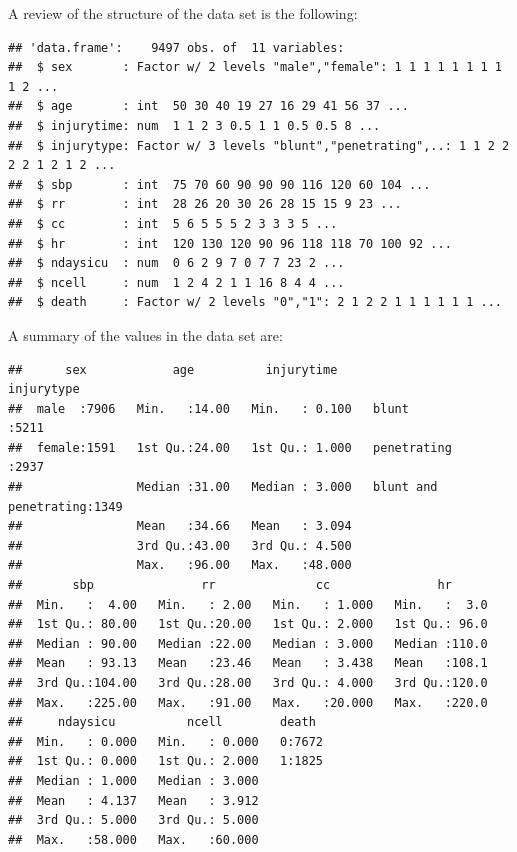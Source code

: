 \documentclass[
]{article}
\begin{document}
A review of the structure of the data set is the following:

\begin{verbatim}
## 'data.frame':    9497 obs. of  11 variables:
##  $ sex       : Factor w/ 2 levels "male","female": 1 1 1 1 1 1 1 1 1 2 ...
##  $ age       : int  50 30 40 19 27 16 29 41 56 37 ...
##  $ injurytime: num  1 1 2 3 0.5 1 1 0.5 0.5 8 ...
##  $ injurytype: Factor w/ 3 levels "blunt","penetrating",..: 1 1 2 2 2 2 1 2 1 2 ...
##  $ sbp       : int  75 70 60 90 90 90 116 120 60 104 ...
##  $ rr        : int  28 26 20 30 26 28 15 15 9 23 ...
##  $ cc        : int  5 6 5 5 5 2 3 3 3 5 ...
##  $ hr        : int  120 130 120 90 96 118 118 70 100 92 ...
##  $ ndaysicu  : num  0 6 2 9 7 0 7 7 23 2 ...
##  $ ncell     : num  1 2 4 2 1 1 16 8 4 4 ...
##  $ death     : Factor w/ 2 levels "0","1": 2 1 2 2 1 1 1 1 1 1 ...
\end{verbatim}

\newpage

A summary of the values in the data set are:

\begin{verbatim}
##      sex            age          injurytime                     injurytype  
##  male  :7906   Min.   :14.00   Min.   : 0.100   blunt                :5211  
##  female:1591   1st Qu.:24.00   1st Qu.: 1.000   penetrating          :2937  
##                Median :31.00   Median : 3.000   blunt and penetrating:1349  
##                Mean   :34.66   Mean   : 3.094                               
##                3rd Qu.:43.00   3rd Qu.: 4.500                               
##                Max.   :96.00   Max.   :48.000                               
##       sbp               rr              cc               hr       
##  Min.   :  4.00   Min.   : 2.00   Min.   : 1.000   Min.   :  3.0  
##  1st Qu.: 80.00   1st Qu.:20.00   1st Qu.: 2.000   1st Qu.: 96.0  
##  Median : 90.00   Median :22.00   Median : 3.000   Median :110.0  
##  Mean   : 93.13   Mean   :23.46   Mean   : 3.438   Mean   :108.1  
##  3rd Qu.:104.00   3rd Qu.:28.00   3rd Qu.: 4.000   3rd Qu.:120.0  
##  Max.   :225.00   Max.   :91.00   Max.   :20.000   Max.   :220.0  
##     ndaysicu          ncell        death   
##  Min.   : 0.000   Min.   : 0.000   0:7672  
##  1st Qu.: 0.000   1st Qu.: 2.000   1:1825  
##  Median : 1.000   Median : 3.000           
##  Mean   : 4.137   Mean   : 3.912           
##  3rd Qu.: 5.000   3rd Qu.: 5.000           
##  Max.   :58.000   Max.   :60.000
\end{verbatim}
\end{document}
